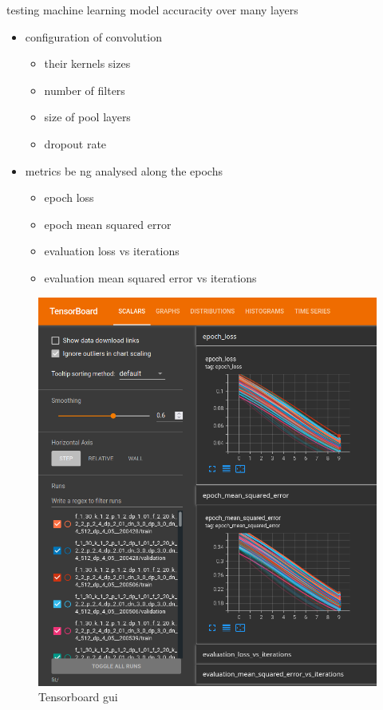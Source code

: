 \documentclass[
    11pt,
    twoside
]{report}
\begin{document}
testing machine learning model accuracity over many layers
\begin{itemize}
\item
configuration of convolution
\begin{itemize}
    \item
      their kernels sizes
    \item
      number of filters
    \item
      size of pool layers
    \item
      dropout rate
\end{itemize}
\item
    metrics be ng analysed along the epochs
\begin{itemize}
    \item
        epoch loss
    \item
        epoch mean squared error
    \item
        evaluation loss vs iterations
    \item
        evaluation mean squared error vs iterations
\end{itemize}
\end{itemize}







\begin{figure}[H]
    \includegraphics[keepaspectratio, width=\columnwidth]{Screenshot_2022-04-17_23-06-29.png}
    \caption{Tensorboard gui}
    \label{img:tensorboard_gui}
\end{figure}
\end{document}
